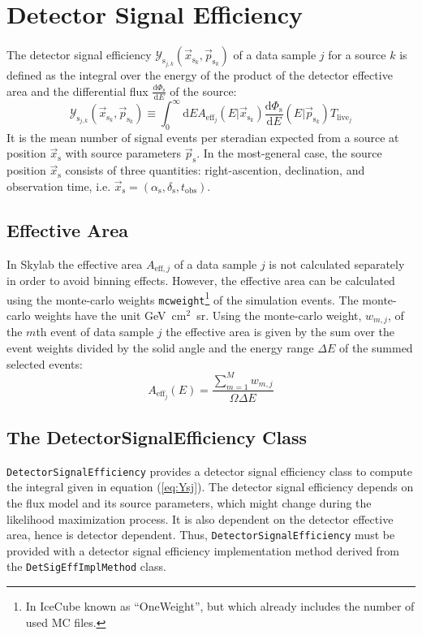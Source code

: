\documentclass{article}
\newcommand{\eq}[1]{(\ref{#1})}
\newcommand{\code}[1]{\texttt{#1}}
\newcommand{\class}[1]{\colorbox{blue!30}{\code{#1}}}
\newcommand{\ps}{\vec{p}_{\mathrm{s}}}
\newcommand{\psk}{\vec{p}_{\mathrm{s}_k}}
\newcommand{\xs}{\vec{x}_{\mathrm{s}}}
\newcommand{\xsk}{\vec{x}_{\mathrm{s}_k}}
\begin{document}
\section{Detector Signal Efficiency}
\label{sec:detsigeff}

The detector signal efficiency $\mathcal{Y}_{\mathrm{s}_{j,k}}(\xsk,\psk)$
of a data sample $j$ for a source $k$ is defined as the integral over the energy
of the product of the detector effective area and the differential flux
$\frac{\mathrm{d}\Phi_{\mathrm{s}}}{\mathrm{d}E}$ of the source:
\begin{equation}
 \mathcal{Y}_{\mathrm{s}_{j,k}}(\xsk,\psk) \equiv \int_0^\infty \mathrm{d}E A_{\mathrm{eff}_j}(E|\xsk) \frac{\mathrm{d}\Phi_{\mathrm{s}}}{\mathrm{d}E}(E|\psk) T_{\mathrm{live}_j}
\label{eq:Ysj}
\end{equation}
It is the mean number of signal events per steradian expected from a source at
position $\xs$ with source parameters $\ps$. In the most-general case,
the source position $\xs$ consists of three quantities: right-ascention,
declination, and observation time, i.e.
$\xs = (\alpha_{\mathrm{s}},\delta_{\mathrm{s}},t_{\mathrm{obs}})$.

\subsection{Effective Area}

In Skylab the effective area $A_{\mathrm{eff},j}$ of a data sample $j$ is not
calculated separately in order to avoid binning effects. However, the effective
area can be calculated using the monte-carlo weights \code{mcweight}\footnote{In IceCube
known as ``OneWeight'', but which already includes the number of used MC files.}
of the simulation events.
The monte-carlo weights have the unit GeV~cm$^2$~sr.
Using the monte-carlo weight, $w_{m,j}$, of the $m$th event of data sample $j$
the effective area is given by the sum over the event weights divided by the
solid angle and the energy range $\Delta E$ of the summed selected events:
\begin{equation}
 A_{\mathrm{eff}_j}(E) = \frac{\sum_{m=1}^{M} w_{m,j}}{\Omega \Delta E}
\end{equation}


\subsection{The DetectorSignalEfficiency Class}

\class{DetectorSignalEfficiency} provides a detector signal efficiency class to
compute the integral given in equation \eq{eq:Ysj}. The detector signal
efficiency depends on the flux model and its source parameters, which might
change during the likelihood maximization process. It is also dependent on the
detector effective area, hence is detector dependent. Thus,
\class{DetectorSignalEfficiency} must be provided with a detector signal
efficiency implementation method derived from the \class{DetSigEffImplMethod}
class.
\end{document}
